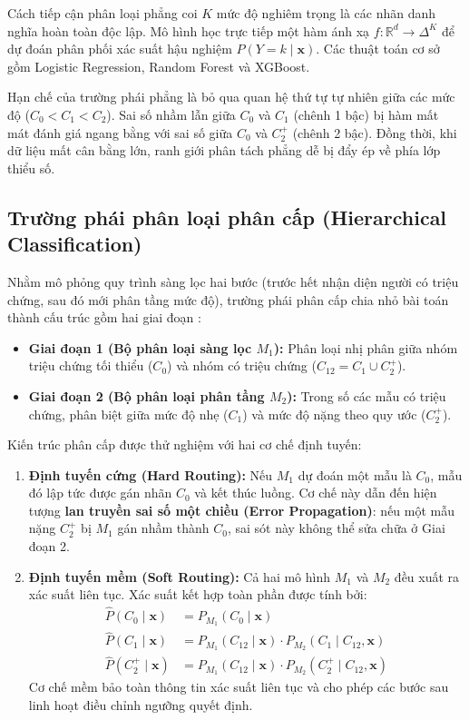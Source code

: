 Cách tiếp cận phân loại phẳng coi $K$ mức độ nghiêm trọng là các nhãn danh nghĩa hoàn toàn độc lập. Mô hình học trực tiếp một hàm ánh xạ $f: \mathbb{R}^d \to \Delta^K$ để dự đoán phân phối xác suất hậu nghiệm $P(Y = k \mid \mathbf{x})$. Các thuật toán cơ sở gồm Logistic Regression, Random Forest và XGBoost.

Hạn chế của trường phái phẳng là bỏ qua quan hệ thứ tự tự nhiên giữa các mức độ ($C_0 < C_1 < C_2$). Sai số nhầm lẫn giữa $C_0$ và $C_1$ (chênh 1 bậc) bị hàm mất mát đánh giá ngang bằng với sai số giữa $C_0$ và $C_2^+$ (chênh 2 bậc). Đồng thời, khi dữ liệu mất cân bằng lớn, ranh giới phân tách phẳng dễ bị đẩy ép về phía lớp thiểu số.

\subsection{Trường phái phân loại phân cấp (Hierarchical Classification)}
\label{subsec:hierarchical-paradigm}

Nhằm mô phỏng quy trình sàng lọc hai bước (trước hết nhận diện người có triệu chứng, sau đó mới phân tầng mức độ), trường phái phân cấp chia nhỏ bài toán thành cấu trúc gồm hai giai đoạn \cite{silla2011survey}:
\begin{itemize}
    \item \textbf{Giai đoạn 1 (Bộ phân loại sàng lọc $M_1$):} Phân loại nhị phân giữa nhóm triệu chứng tối thiểu ($C_0$) và nhóm có triệu chứng ($C_{12} = C_1 \cup C_2^+$).
    \item \textbf{Giai đoạn 2 (Bộ phân loại phân tầng $M_2$):} Trong số các mẫu có triệu chứng, phân biệt giữa mức độ nhẹ ($C_1$) và mức độ nặng theo quy ước ($C_2^+$).
\end{itemize}

Kiến trúc phân cấp được thử nghiệm với hai cơ chế định tuyến:
\begin{enumerate}
    \item \textbf{Định tuyến cứng (Hard Routing):} Nếu $M_1$ dự đoán một mẫu là $C_0$, mẫu đó lập tức được gán nhãn $C_0$ và kết thúc luồng. Cơ chế này dẫn đến hiện tượng \textbf{lan truyền sai số một chiều (Error Propagation)}: nếu một mẫu nặng $C_2^+$ bị $M_1$ gán nhầm thành $C_0$, sai sót này không thể sửa chữa ở Giai đoạn 2.
    \item \textbf{Định tuyến mềm (Soft Routing):} Cả hai mô hình $M_1$ và $M_2$ đều xuất ra xác suất liên tục. Xác suất kết hợp toàn phần được tính bởi:
    \begin{align}
        \hat{P}(C_0 \mid \mathbf{x}) &= P_{M_1}(C_0 \mid \mathbf{x}) \\
        \hat{P}(C_1 \mid \mathbf{x}) &= P_{M_1}(C_{12} \mid \mathbf{x}) \cdot P_{M_2}(C_1 \mid C_{12}, \mathbf{x}) \\
        \hat{P}(C_2^+ \mid \mathbf{x}) &= P_{M_1}(C_{12} \mid \mathbf{x}) \cdot P_{M_2}(C_2^+ \mid C_{12}, \mathbf{x})
    \end{align}
    Cơ chế mềm bảo toàn thông tin xác suất liên tục và cho phép các bước sau linh hoạt điều chỉnh ngưỡng quyết định.
\end{enumerate}

